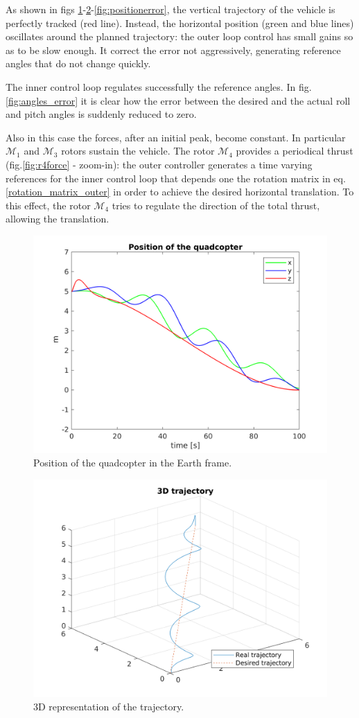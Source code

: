 \documentclass[11pt,a4paper]{scrartcl}
\begin{document}
As shown in figs \ref{fig:position}-\ref{fig:3dpositionnormal}-\ref{fig:positionerror}, the vertical trajectory of the vehicle is perfectly tracked (red line). Instead, the horizontal position (green and blue lines) oscillates around the planned trajectory: the outer loop control has small gains so as to be slow enough. It correct the error not aggressively, generating reference angles that do not change quickly.

The inner control loop regulates successfully the reference angles. In fig.\ref{fig:angles_error} it is clear how the error between the desired and the actual roll and pitch angles is suddenly reduced to zero.

Also in this case the forces, after an initial peak, become constant. In particular $ \mathcal{M}_1 $ and $ \mathcal{M}_3 $ rotors sustain the vehicle. The rotor $ \mathcal{M}_4 $ provides a periodical thrust (fig.\ref{fig:r4force} - zoom-in): the outer controller generates a time varying references for the inner control loop that depends one the rotation matrix in eq.\eqref{rotation_matrix_outer} in order to achieve the desired horizontal translation. To this effect, the rotor $ \mathcal{M}_4 $ tries to regulate the direction of the total thrust, allowing the translation. 

\begin{figure}[H]
	\centering
	\includegraphics[width=0.7\linewidth]{Images/Position}
	\caption{Position of the quadcopter in the Earth frame.}
	\label{fig:position}
\end{figure}

\begin{figure}
	\centering
	\includegraphics[width=0.7\linewidth]{Images/3dPosition_normal}
	\caption{3D representation of the trajectory.}
	\label{fig:3dpositionnormal}
\end{figure}
\end{document}
